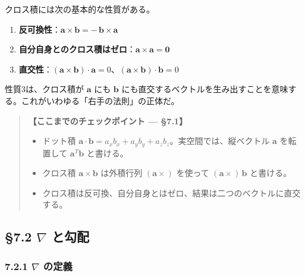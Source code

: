 \documentclass[a4paper,12pt,openany]{book}
\providecommand{\tightlist}{%
  \setlength{\itemsep}{0pt}\setlength{\parskip}{0pt}}
\begin{document}
クロス積には次の基本的な性質がある。

\begin{enumerate}
\def\labelenumi{\arabic{enumi}.}
\tightlist
\item
  \textbf{反可換性}：\(\mathbf{a} \times \mathbf{b} = -\,\mathbf{b} \times \mathbf{a}\)
\item
  \textbf{自分自身とのクロス積はゼロ}：\(\mathbf{a} \times \mathbf{a} = \mathbf{0}\)
\item
  \textbf{直交性}：\((\mathbf{a} \times \mathbf{b}) \cdot \mathbf{a} = 0\)、\((\mathbf{a} \times \mathbf{b}) \cdot \mathbf{b} = 0\)
\end{enumerate}

性質3は、クロス積が \(\mathbf{a}\) にも \(\mathbf{b}\)
にも直交するベクトルを生み出すことを意味する。これがいわゆる「右手の法則」の正体だ。

\begin{quote}
\textbf{【ここまでのチェックポイント — §7.1】}

\begin{itemize}
\item
  ドット積
  \(\mathbf{a}\cdot\mathbf{b} = a_x b_x + a_y b_y + a_z b_z\)。実空間では、縦ベクトル
  \(\mathbf{a}\) を転置して \(\mathbf{a}^T \mathbf{b}\) と書ける。
\item
  クロス積 \(\mathbf{a}\times\mathbf{b}\) は外積行列
  \((\mathbf{a}\times)\) を使って \((\mathbf{a}\times)\,\mathbf{b}\)
  と書ける。
\item
  クロス積は反可換、自分自身とはゼロ、結果は二つのベクトルに直交する。
\end{itemize}
\end{quote}

\par\vspace{0.35em}\par

\hypertarget{nabla-ux3068ux52feux914d}{%
\subsection{\texorpdfstring{§7.2 \(\nabla\)
と勾配}{§7.2 \textbackslash nabla と勾配}}\label{nabla-ux3068ux52feux914d}}

\hypertarget{nabla-ux306eux5b9aux7fa9}{%
\subsubsection{\texorpdfstring{7.2.1 \(\nabla\)
の定義}{7.2.1 \textbackslash nabla の定義}}\label{nabla-ux306eux5b9aux7fa9}}
\end{document}

